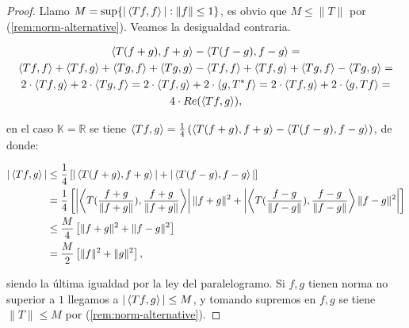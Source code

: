 \begin{proof}
  Llamo $M=\sup \{|\left\langle Tf,f\right\rangle|:\|f\|\le 1\} $, es obvio que $M\le
  \|T\|$ por (\ref{rem:norm-alternative}). Veamos la desigualdad contraria.

  \begin{gather*}
  \left\langle T(f+g),f+g\right\rangle- \left\langle T(f-g),f-g\right\rangle=\\
  \left\langle Tf,f\right\rangle+ \left\langle Tf,g\right\rangle + \left\langle Tg,f\right\rangle+ \left\langle Tg,g\right\rangle-
  \left\langle Tf,f\right\rangle+ \left\langle Tf,g\right\rangle + \left\langle Tg,f\right\rangle- \left\langle Tg,g\right\rangle=\\
  2\cdot \left\langle Tf,g\right\rangle + 2\cdot \left\langle Tg,f\right\rangle=
  2\cdot \left\langle Tf,g\right\rangle + 2\cdot \left\langle g,T^*f\right\rangle=
  2\cdot \left\langle Tf,g\right\rangle + 2\cdot \left\langle g,Tf\right\rangle=\\
  4\cdot Re(\left\langle Tf,g\right\rangle)
  ,\end{gather*}

  en el caso $\mathbb{K}=\mathbb{R}$ se tiene
  $\left\langle Tf,g\right\rangle=\frac{1}{4}\left(\left\langle T(f+g),f+g\right\rangle- \left\langle T(f-g),f-g\right\rangle\right)$, de donde:

  \begin{align*}
    |\left\langle Tf,g\right\rangle| & \le \frac{1}{4}\left[|\left\langle T(f+g),f+g\right\rangle| + |\left\langle T(f-g),f-g\right\rangle|  \right] \\
                   & = \frac{1}{4}\left[\left|\left\langle T(\frac{f+g}{\|f+g\|}),\frac{f+g}{\|f+g\|}\right\rangle\right|\|f+g\|^2
                       +\left|\left\langle T(\frac{f-g}{\|f-g\|}),\frac{f-g}{\|f-g\|}\right\rangle\|f-g\|^2\right|\right]\\
                   & \le \frac{M}{4}\left[ \|f+g\|^2+\|f-g\|^2 \right] \\
                   & = \frac{M}{2} \left[ \|f\|^2+\|g\|^2 \right] 
  ,\end{align*}
  
  siendo la última igualdad por la ley del paralelogramo. Si $f,g$ tienen
  norma no superior a $1$ llegamos a $|\left\langle Tf,g\right\rangle|\le M$, y tomando
  supremos en $f,g$ se tiene $\|T\|\le  M$ por (\ref{rem:norm-alternative}).





\end{proof}

